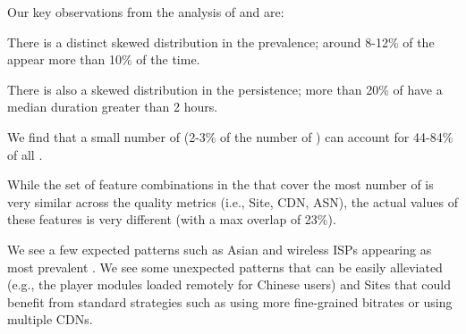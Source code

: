 Our key observations from the analysis of \problemclusters 
and  \criticalclusters  are:  

\begin{packeditemize}

\item There is a distinct skewed distribution  in the prevalence; 
around 8-12\% of the \problemclusters appear more than 
10\% of the time.

\item There is also a skewed distribution  in the persistence; 
more than 20\% of  \problemclusters have a median duration 
greater than 2 hours.  

\item We find that a small number of \criticalclusters 
(2-3\% of the number of \problemclusters) can account 
for 44-84\% of all \problemsessions. 

\item While the set of feature combinations in the 
\criticalclusters that cover the most number of 
\problemsessions is very similar across the quality
metrics (i.e., Site, CDN, ASN), the actual values of 
these features is very different (with a max overlap of 23\%). 

\item  We see a few expected patterns  such as Asian 
and wireless ISPs appearing  as most prevalent \criticalclusters. 
We  see some unexpected patterns that can be easily alleviated 
(e.g., the player modules loaded remotely for Chinese users) 
and Sites that could benefit from standard strategies such as 
using more fine-grained bitrates or using multiple CDNs.

\end{packeditemize}



